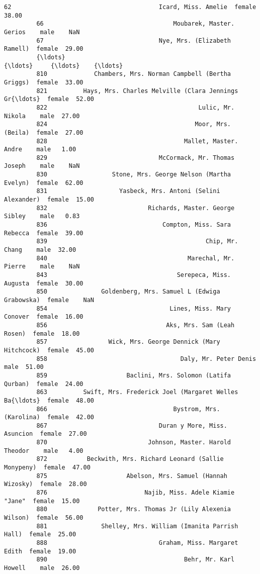 \documentclass[11pt]{article}
\begin{document}
\begin{Verbatim}[commandchars=\\\{\}]
         62                                         Icard, Miss. Amelie  female  38.00   
         66                                    Moubarek, Master. Gerios    male    NaN   
         67                                Nye, Mrs. (Elizabeth Ramell)  female  29.00   
         {\ldots}                                                        {\ldots}     {\ldots}    {\ldots}   
         810             Chambers, Mrs. Norman Campbell (Bertha Griggs)  female  33.00   
         821          Hays, Mrs. Charles Melville (Clara Jennings Gr{\ldots}  female  52.00   
         822                                          Lulic, Mr. Nikola    male  27.00   
         824                                         Moor, Mrs. (Beila)  female  27.00   
         828                                      Mallet, Master. Andre    male   1.00   
         829                               McCormack, Mr. Thomas Joseph    male    NaN   
         830                  Stone, Mrs. George Nelson (Martha Evelyn)  female  62.00   
         831                    Yasbeck, Mrs. Antoni (Selini Alexander)  female  15.00   
         832                            Richards, Master. George Sibley    male   0.83   
         836                                Compton, Miss. Sara Rebecca  female  39.00   
         839                                            Chip, Mr. Chang    male  32.00   
         840                                       Marechal, Mr. Pierre    male    NaN   
         843                                    Serepeca, Miss. Augusta  female  30.00   
         850               Goldenberg, Mrs. Samuel L (Edwiga Grabowska)  female    NaN   
         854                                  Lines, Miss. Mary Conover  female  16.00   
         856                                 Aks, Mrs. Sam (Leah Rosen)  female  18.00   
         857                 Wick, Mrs. George Dennick (Mary Hitchcock)  female  45.00   
         858                                     Daly, Mr. Peter Denis     male  51.00   
         859                      Baclini, Mrs. Solomon (Latifa Qurban)  female  24.00   
         863          Swift, Mrs. Frederick Joel (Margaret Welles Ba{\ldots}  female  48.00   
         866                                   Bystrom, Mrs. (Karolina)  female  42.00   
         867                               Duran y More, Miss. Asuncion  female  27.00   
         870                            Johnson, Master. Harold Theodor    male   4.00   
         872           Beckwith, Mrs. Richard Leonard (Sallie Monypeny)  female  47.00   
         875                      Abelson, Mrs. Samuel (Hannah Wizosky)  female  28.00   
         876                           Najib, Miss. Adele Kiamie "Jane"  female  15.00   
         880              Potter, Mrs. Thomas Jr (Lily Alexenia Wilson)  female  56.00   
         881               Shelley, Mrs. William (Imanita Parrish Hall)  female  25.00   
         888                               Graham, Miss. Margaret Edith  female  19.00   
         890                                      Behr, Mr. Karl Howell    male  26.00   
         

\end{Verbatim}
\end{document}
